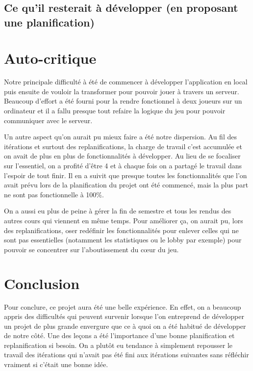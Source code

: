 \documentclass[a4paper,12pt]{article}
\begin{document}
	
	\subsection{Ce qu'il resterait à développer (en proposant une planification)}
	
	
	\section{Auto-critique}
	
	Notre principale difficulté à été de commencer à développer l'application en local puis ensuite de vouloir la transformer pour pouvoir jouer à travers un serveur. Beaucoup d'effort a été fourni pour la rendre fonctionnel à deux joueurs sur un ordinateur et il a fallu presque tout refaire la logique du jeu pour pouvoir communiquer avec le serveur.
	
	Un autre aspect qu'on aurait pu mieux faire a été notre dispersion. Au fil des itérations et surtout des replanifications, la charge de travail c'est accumulée et on avait de plus en plus de fonctionnalités à développer. Au lieu de se focaliser sur l'essentiel, on a profité d'être 4 et à chaque fois on a partagé le travail dans l'espoir de tout finir. Il en a suivit que presque toutes les fonctionnalités que l'on avait prévu lors de la planification du projet ont été commencé, mais la plus part ne sont pas fonctionnelle à 100\%.
	
	On a aussi eu plus de peine à gérer la fin de semestre et tous les rendus des autres cours qui viennent en même temps. Pour améliorer ça, on aurait pu, lors des replanifications, oser redéfinir les fonctionnalités pour enlever celles qui ne sont pas essentielles (notamment les statistiques ou le lobby par exemple) pour pouvoir se concentrer sur l'aboutissement du cœur du jeu.


	\section{Conclusion}
	Pour conclure, ce projet aura été une belle expérience. En effet, on a beaucoup appris des difficultés qui peuvent survenir lorsque l'on entreprend de développer un projet de plus grande envergure que ce à quoi on a été habitué de développer de notre côté. Une des leçons a été l'importance d'une bonne planification et replanification si besoin. On a plutôt eu tendance à simplement repousser le travail des itérations qui n'avait pas été fini aux itérations suivantes sans réfléchir vraiment si c'était une bonne idée.
	
\end{document}
